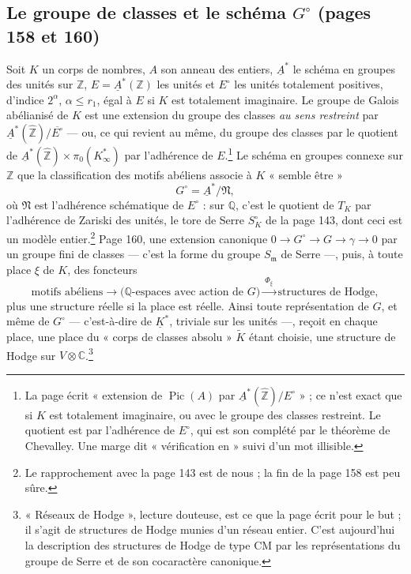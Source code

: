 \documentclass[11pt,a4paper]{article}
\begin{document}
\subsection*{Le groupe de classes et le schéma $G^{\circ}$ (pages 158 et 160)}

Soit $K$ un corps de nombres, $A$ son anneau des entiers, $\underline{A}^{*}$ le
schéma en groupes des unités sur $\mathbb{Z}$, $E = \underline{A}^{*}(\mathbb{Z})$
les unités et $E^{\circ}$ les unités totalement positives, d'indice $2^{\alpha}$,
$\alpha \leqslant r_{1}$, égal à $E$ si $K$ est totalement imaginaire. Le groupe
de Galois abélianisé de $K$ est une extension du groupe des classes \emph{au
sens restreint} par $\underline{A}^{*}(\widehat{\mathbb{Z}})/\overline{E^{\circ}}$
--- ou, ce qui revient au même, du groupe des classes par le quotient de
$\underline{A}^{*}(\widehat{\mathbb{Z}}) \times \pi_{0}(K_{\infty}^{*})$ par
l'adhérence de $E$.\footnote{La page écrit « extension de $\operatorname{Pic}(A)$
par $\underline{A}^{*}(\widehat{\mathbb{Z}})/E^{\circ}$ » ; ce n'est exact que si
$K$ est totalement imaginaire, ou avec le groupe des classes restreint. Le
quotient est par l'adhérence de $E^{\circ}$, qui est son complété par le théorème
de Chevalley. Une marge dit « vérification en » suivi d'un mot illisible.} Le
schéma en groupes connexe sur $\mathbb{Z}$ que la classification des motifs
abéliens associe à $K$ « semble être »
\[
  G^{\circ} = \underline{A}^{*}/\mathfrak{N} ,
\]
où $\mathfrak{N}$ est l'adhérence schématique de $E^{\circ}$ : sur $\mathbb{Q}$,
c'est le quotient de $T_{K}$ par l'adhérence de Zariski des unités, le tore de
Serre $S^{\circ}_{K}$ de la page 143, dont ceci est un modèle
entier.\footnote{Le rapprochement avec la page 143 est de nous ; la fin de la page
158 est peu sûre.} Page 160, une extension canonique $0 \to G^{\circ} \to G \to
\gamma \to 0$ par un groupe fini de classes --- c'est la forme du groupe
$S_{\mathfrak{m}}$ de Serre ---, puis, à toute place $\xi$ de $K$, des foncteurs
\[
  \text{motifs abéliens} \longrightarrow \bigl(\mathbb{Q}\text{-espaces avec
  action de } G\bigr) \xrightarrow{\ \Phi_{\xi}\ } \text{structures de Hodge} ,
\]
plus une structure réelle si la place est réelle. Ainsi toute représentation de
$G$, et même de $G^{\circ}$ --- c'est-à-dire de $\underline{K}^{*}$, triviale sur
les unités ---, reçoit en chaque place, une place du « corps de classes absolu »
$\widetilde{K}$ étant choisie, une structure de Hodge sur $V \otimes
\mathbb{C}$.\footnote{« Réseaux de Hodge », lecture douteuse, est ce que la page
écrit pour le but ; il s'agit de structures de Hodge munies d'un réseau entier.
C'est aujourd'hui la description des structures de Hodge de type CM par les
représentations du groupe de Serre et de son cocaractère canonique.}
\end{document}
